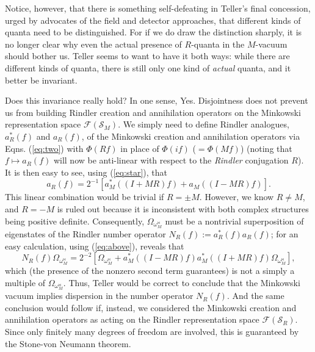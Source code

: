 \documentclass[12pt]{article}
\theoremstyle{remark}
\theoremstyle{definition}
\newcommand{\hil}[1]{\mathcal{#1}}
\begin{document}
Notice, however, that there is something 
self-defeating in Teller's final concession, urged by advocates of the 
field and detector 
approaches,
that different kinds of quanta need to be 
distinguished.  For if we do draw the distinction sharply, it is no 
longer clear why even the actual presence of $R$-quanta in the $M$-vacuum 
should bother us.  
Teller seems to want to have it both ways: while there are different 
kinds of quanta, there is still only one kind of \emph{actual} quanta, and it 
better be invariant.   

Does this invariance really hold?  In one sense, Yes.  Disjointness does not 
prevent us from building Rindler 
creation and annihilation operators on the Minkowski representation 
space $\hil{F}(\hil{S}_{M})$.  We simply need to define Rindler 
analogues, $a_{R}^{*}(f)$  and $a_{R}(f)$, of the Minkowski creation 
and annihilation operators 
via Eqns. (\ref{eq:two}) with $\Phi(Rf)$ in place of $\Phi(if)$ 
($=\Phi(Mf)$) (noting that $f\mapsto a_{R}(f)$ will now be anti-linear 
with respect to the \emph{Rindler} conjugation $R$).   It 
is then easy to see, using (\ref{eq:star}), that
\begin{equation} \label{eq:above}   
a_{R}(f)=2^{-1}[a_{M}^{*}((I+MR)f)+a_{M}((I-MR)f)].
\end{equation}
This linear combination would be trivial if $R=\pm M$.  However, 
we know 
$R\not=M$, and $R=-M$ is ruled out because it is inconsistent with 
both complex structures being positive definite.  
Consequently, $\Omega_{\omega_{M}^{\bowtie}}$ must be a 
nontrivial superposition of 
eigenstates of 
the Rindler number operator $N_{R}(f):=a_{R}^{*}(f)a_{R}(f)$; for an 
easy calculation, using (\ref{eq:above}), reveals that  
\begin{equation} \label{eq:invariant?}
N_{R}(f)\Omega_{\omega_{M}^{\bowtie}}=
2^{-2}[\Omega_{\omega_{M}^{\bowtie}}
+a_{M}^{*}((I-MR)f)a_{M}^{*}((I+MR)f)\Omega_{\omega_{M}^{\bowtie}}],
\end{equation}
which (the presence of the nonzero second term guarantees) is not
 a simply a multiple of $\Omega_{\omega_{M}^{\bowtie}}$.  Thus, 
Teller  would be correct to conclude that the Minkowski vacuum implies dispersion 
in the number operator $N_{R}(f)$.  And the same conclusion would follow if, 
instead, we considered the 
Minkowski creation and annihilation operators as acting on the Rindler 
representation space $\hil{F}(\hil{S}_{R})$.  Since only finitely 
many degrees of freedom are involved, this is guaranteed by the 
Stone-von Neumann theorem.
\end{document}
